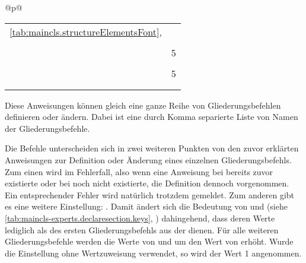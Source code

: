 \begin{longtable}{@{}p{\columnwidth}@{}}
\begin{tabularx}{\linewidth}{ll}
                           \autoref{tab:maincls.structureElementsFont}, 
                           \autopageref{tab:maincls.structureElementsFont} \\
    \PValue{indent}      & \Macro{scr@parindent} \\
    \PValue{level}       & 5 \\
    \PValue{tocindent}   & \PValue{12em}\\
    \PValue{toclevel}    & 5 \\
    \PValue{tocnumwidth} & \PValue{6em}\\
    \PValue{tocstyle}    & \PValue{section} \\
    \bottomrule
    \end{tabularx}
  \end{longtable}
\EndIndexGroup


\begin{Declaration}
\end{Declaration}
Diese Anweisungen können gleich eine ganze Reihe von
Gliederungsbefehlen definieren oder ändern. Dabei ist  eine
durch Komma separierte Liste von Namen der Gliederungsbefehle.

Die Befehle unterscheiden sich in zwei weiteren Punkten von den zuvor
erklärten Anweisungen zur Definition oder Änderung eines einzelnen
Gliederungsbefehls. Zum einen wird im Fehlerfall,
also wenn eine Anweisung bei  bereits zuvor
existierte oder bei  noch nicht existierte,
die Definition dennoch vorgenommen. Ein entsprechender Fehler wird natürlich
trotzdem gemeldet.  Zum anderen gibt es eine weitere Einstellung:
.
Damit ändert sich die Bedeutung von  und 
(siehe \autoref{tab:maincls-experts.declaresection.keys},
) dahingehend, dass deren
Werte lediglich als  des ersten Gliederungsbefehls aus
der  dienen. Für alle weiteren Gliederungsbefehle werden
die Werte von  und  um den Wert von
 erhöht. Wurde die Einstellung 
ohne Wertzuweisung verwendet, so wird der Wert 1 angenommen.%
\EndIndexGroup


